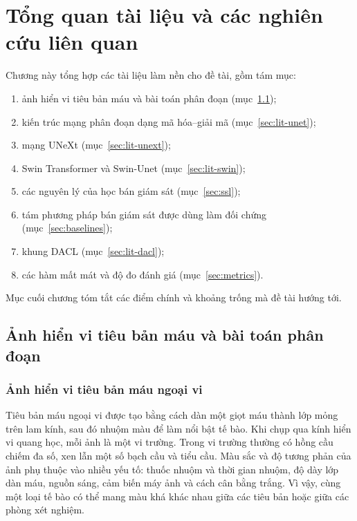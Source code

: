 \chapter{Tổng quan tài liệu và các nghiên cứu liên quan}
\label{chap:tongquan}

Chương này tổng hợp các tài liệu làm nền cho đề tài, gồm tám mục:
\begin{enumerate}[label=(\arabic*)]
  \item ảnh hiển vi tiêu bản máu và bài toán phân đoạn (mục~\ref{sec:lit-problem});
  \item kiến trúc mạng phân đoạn dạng mã hóa--giải mã (mục~\ref{sec:lit-unet});
  \item mạng UNeXt (mục~\ref{sec:lit-unext});
  \item Swin Transformer và Swin-Unet (mục~\ref{sec:lit-swin});
  \item các nguyên lý của học bán giám sát (mục~\ref{sec:ssl});
  \item tám phương pháp bán giám sát được dùng làm đối chứng (mục~\ref{sec:baselines});
  \item khung DACL (mục~\ref{sec:lit-dacl});
  \item các hàm mất mát và độ đo đánh giá (mục~\ref{sec:metrics}).
\end{enumerate}
Mục cuối chương tóm tắt các điểm chính và khoảng trống mà đề tài hướng tới.

\section{Ảnh hiển vi tiêu bản máu và bài toán phân đoạn}
\label{sec:lit-problem}

\subsection{Ảnh hiển vi tiêu bản máu ngoại vi}

Tiêu bản máu ngoại vi được tạo bằng cách dàn một giọt máu thành lớp mỏng trên lam kính, sau đó nhuộm màu để làm nổi bật tế bào. Khi chụp qua kính hiển vi quang học, mỗi ảnh là một vi trường. Trong vi trường thường có hồng cầu chiếm đa số, xen lẫn một số bạch cầu và tiểu cầu. Màu sắc và độ tương phản của ảnh phụ thuộc vào nhiều yếu tố: thuốc nhuộm và thời gian nhuộm, độ dày lớp dàn máu, nguồn sáng, cảm biến máy ảnh và cách cân bằng trắng. Vì vậy, cùng một loại tế bào có thể mang màu khá khác nhau giữa các tiêu bản hoặc giữa các phòng xét nghiệm.


